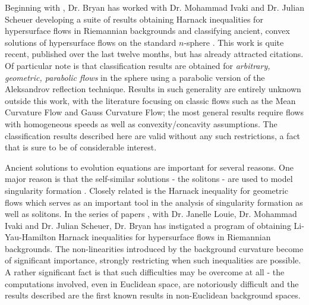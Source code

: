 \documentclass[12pt]{amsart}
\begin{document}
Beginning with \cite{bryanlouie}, Dr. Bryan has worked with Dr. Mohammad Ivaki and Dr. Julian Scheuer developing a suite of results obtaining Harnack inequalities for hypersurface flows in Riemannian backgrounds and classifying ancient, convex solutions of hypersurface flows on the standard $n$-sphere \cite{BIS4,2016arXiv160401694B,2016arXiv160401694B,2015arXiv150802821B}. This work is quite recent, published over the last twelve months, but has already attracted citations. Of particular note is that classification results are obtained for \emph{arbitrary, geometric, parabolic flows} in the sphere using a parabolic version of the Aleksandrov reflection technique. Results in such generality are entirely unknown outside this work, with the literature focusing on classic flows such as the Mean Curvature Flow and Gauss Curvature Flow; the most general results require flows with homogeneous speeds as well as convexity/concavity assumptions. The classification results described here are valid without any such restrictions, a fact that is sure to be of considerable interest.

Ancient solutions to evolution equations are important for several reasons. One major reason is that the self-similar solutions - the solitons - are used to model singularity formation \cite{MR1375255,MR1666878}. Closely related is the Harnack inequality for geometric flows \cite{MR1296393,MR1316556,MR1100812,MR1198607} which serves as an important tool in the analysis of singularity formation as well as solitons. In the series of papers \cite{bryanlouie,2016arXiv160401694B,2015arXiv150802821B,2015arXiv151203374B}, with Dr. Janelle Louie, Dr. Mohammad Ivaki and Dr. Julian Scheuer, Dr. Bryan has instigated a program of obtaining Li-Yau-Hamilton Harnack inequalities for hypersurface flows in Riemannian backgrounds. The non-linearities introduced by the background curvature become of significant importance, strongly restricting when such inequalities are possible. A rather significant fact is that such difficulties may be overcome at all - the computations involved, even in Euclidean space, are notoriously difficult and the results described are the first known results in non-Euclidean background spaces.
\end{document}
